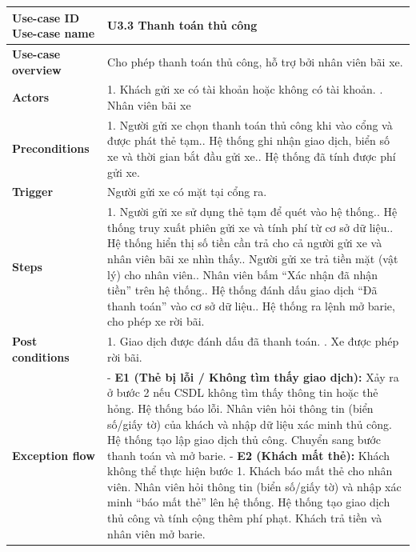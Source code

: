 \begin{tabularx}{\textwidth}{|>{\raggedright\arraybackslash}p{4cm}|X|}
\hline
\textbf{Use-case ID} \newline \textbf{Use-case name} & U3.3 \newline \textbf{Thanh toán thủ công} \\ \hline
\textbf{Use-case overview} & Cho phép thanh toán thủ công, hỗ trợ bởi nhân viên bãi xe. \\ \hline
\textbf{Actors} & 1. Khách gửi xe có tài khoản hoặc không có tài khoản. \newline
                    2. Nhân viên bãi xe\\ \hline
\textbf{Preconditions} & 
1. Người gửi xe chọn thanh toán thủ công khi vào cổng và được phát thẻ tạm.\newline
2. Hệ thống ghi nhận giao dịch, biển số xe và thời gian bắt đầu gửi xe.\newline
2. Hệ thống đã tính được phí gửi xe.
\\ \hline
\textbf{Trigger} & Người gửi xe có mặt tại cổng ra. \\ \hline
\textbf{Steps} & 
1. Người gửi xe sử dụng thẻ tạm để quét vào hệ thống.\newline
2. Hệ thống truy xuất phiên gửi xe và tính phí từ cơ sở dữ liệu.\newline
3. Hệ thống hiển thị số tiền cần trả cho cả người gửi xe và nhân viên bãi xe nhìn thấy.\newline
4. Người gửi xe trả tiền mặt (vật lý) cho nhân viên.\newline
5. Nhân viên bấm ``Xác nhận đã nhận tiền'' trên hệ thống.\newline
6. Hệ thống đánh dấu giao dịch ``Đã thanh toán'' vào cơ sở dữ liệu.\newline
7. Hệ thống ra lệnh mở barie, cho phép xe rời bãi.
 \\ \hline
\textbf{Post conditions} & 1. Giao dịch được đánh dấu đã thanh toán. \newline
                            2. Xe được phép rời bãi.

 \\ \hline
\textbf{Exception flow} & 
- \textbf{E1 (Thẻ bị lỗi / Không tìm thấy giao dịch):} Xảy ra ở bước 2 nếu CSDL không tìm thấy thông tin hoặc thẻ hỏng. Hệ thống báo lỗi. 
                                Nhân viên hỏi thông tin (biển số/giấy tờ) của khách và nhập dữ liệu xác minh thủ công. Hệ thống tạo lập giao dịch thủ công. Chuyển sang bước thanh toán và mở barie. \newline
- \textbf{E2 (Khách mất thẻ):} Khách không thể thực hiện bước 1. Khách báo mất thẻ cho nhân viên. Nhân viên hỏi thông tin (biển số/giấy tờ) và nhập xác minh ``báo mất thẻ'' lên hệ thống. 
                        Hệ thống tạo giao dịch thủ công và tính cộng thêm phí phạt. Khách trả tiền và nhân viên mở barie.
 \\ \hline
\end{tabularx}

